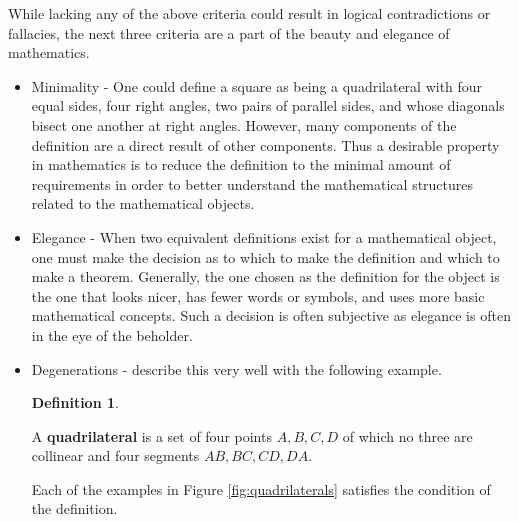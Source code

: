 \documentclass[
]{book}
\theoremstyle{definition}
\newtheorem{definition}{Definition}[chapter]
\theoremstyle{definition}
\theoremstyle{definition}
\theoremstyle{definition}
\theoremstyle{remark}
\begin{document}
While lacking any of the above criteria could result in logical contradictions or fallacies, the next three criteria are a part of the beauty and elegance of mathematics.

\begin{itemize}
\item
  Minimality - One could define a square as being a quadrilateral with four equal sides, four right angles, two pairs of parallel sides, and whose diagonals bisect one another at right angles. However, many components of the definition are a direct result of other components. Thus a desirable property in mathematics is to reduce the definition to the minimal amount of requirements in order to better understand the mathematical structures related to the mathematical objects.
\item
  Elegance - When two equivalent definitions exist for a mathematical object, one must make the decision as to which to make the definition and which to make a theorem. Generally, the one chosen as the definition for the object is the one that looks nicer, has fewer words or symbols, and uses more basic mathematical concepts. Such a decision is often subjective as elegance is often in the eye of the beholder.
\item
  Degenerations - \citet{Dormolen2003} describe this very well with the following example.

  \begin{definition}
  \protect\hypertarget{def:quadrilateral}{}\label{def:quadrilateral}

  A \textbf{quadrilateral} is a set of four points \(A, B, C, D\) of which no three are collinear and four segments \(AB, BC, CD, DA\).

  \end{definition}

  Each of the examples in Figure \ref{fig:quadrilaterals} satisfies the condition of the definition.

  \begin{figure}


\end{figure}
\end{itemize}
\end{document}

